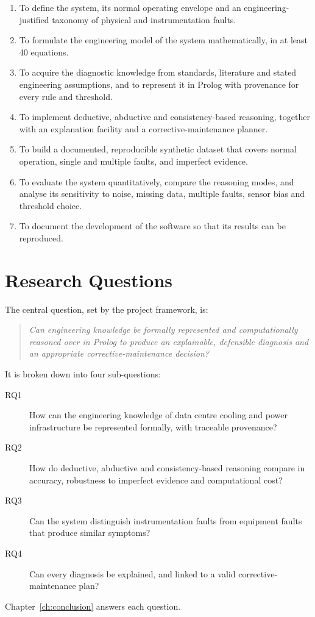 \begin{enumerate}
  \item To define the system, its normal operating envelope and an engineering-justified taxonomy of physical and instrumentation faults.
  \item To formulate the engineering model of the system mathematically, in at least 40 equations.
  \item To acquire the diagnostic knowledge from standards, literature and stated engineering assumptions, and to represent it in Prolog with provenance for every rule and threshold.
  \item To implement deductive, abductive and consistency-based reasoning, together with an explanation facility and a corrective-maintenance planner.
  \item To build a documented, reproducible synthetic dataset that covers normal operation, single and multiple faults, and imperfect evidence.
  \item To evaluate the system quantitatively, compare the reasoning modes, and analyse its sensitivity to noise, missing data, multiple faults, sensor bias and threshold choice.
  \item To document the development of the software so that its results can be reproduced.
\end{enumerate}

\section{Research Questions}
\label{sec:questions}

The central question, set by the project framework, is:

\begin{quote}
  \emph{Can engineering knowledge be formally represented and computationally reasoned over in Prolog to produce an explainable, defensible diagnosis and an appropriate corrective-maintenance decision?}
\end{quote}

It is broken down into four sub-questions:
\begin{description}
  \item[RQ1] How can the engineering knowledge of data centre cooling and power infrastructure be represented formally, with traceable provenance?
  \item[RQ2] How do deductive, abductive and consistency-based reasoning compare in accuracy, robustness to imperfect evidence and computational cost?
  \item[RQ3] Can the system distinguish instrumentation faults from equipment faults that produce similar symptoms?
  \item[RQ4] Can every diagnosis be explained, and linked to a valid corrective-maintenance plan?
\end{description}
Chapter~\ref{ch:conclusion} answers each question.

